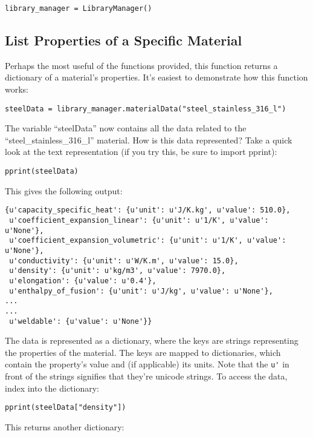 \documentclass[letter]{article}
\begin{document}
\begin{lstlisting}
library_manager = LibraryManager()
\end{lstlisting}

\subsection{List Properties of a Specific Material}
Perhaps the most useful of the functions provided, this function returns a dictionary of a material's properties. It's easiest to demonstrate how this function works:

\begin{lstlisting}
steelData = library_manager.materialData("steel_stainless_316_l")
\end{lstlisting}

The variable ``steelData'' now contains all the data related to the ``steel\_stainless\_316\_l'' material. How is this data represented? Take a quick look at the text representation (if you try this, be sure to import pprint):

\begin{lstlisting}
pprint(steelData)
\end{lstlisting}

This gives the following output:

\begin{lstlisting}
{u'capacity_specific_heat': {u'unit': u'J/K.kg', u'value': 510.0},
 u'coefficient_expansion_linear': {u'unit': u'1/K', u'value': u'None'},
 u'coefficient_expansion_volumetric': {u'unit': u'1/K', u'value': u'None'},
 u'conductivity': {u'unit': u'W/K.m', u'value': 15.0},
 u'density': {u'unit': u'kg/m3', u'value': 7970.0},
 u'elongation': {u'value': u'0.4'},
 u'enthalpy_of_fusion': {u'unit': u'J/kg', u'value': u'None'},
...
...
 u'weldable': {u'value': u'None'}}
\end{lstlisting}

The data is represented as a dictionary, where the keys are strings representing the properties of the material. The keys are mapped to dictionaries, which contain the property's value and (if applicable) its units.  Note that the \verb;u'; in front of the strings signifies that they're unicode strings. To access the data, index into the dictionary:

\begin{lstlisting}
pprint(steelData["density"])
\end{lstlisting}

This returns another dictionary:
\end{document}
